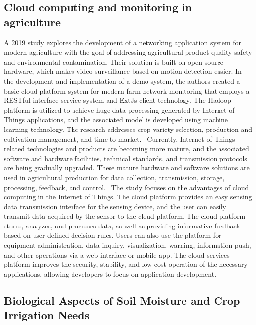 \documentclass[11pt]{scrartcl} %
\begin{document}
\subsection{Cloud computing and monitoring in agriculture}
A 2019 study explores the development of a networking application system for modern agriculture with the goal of addressing agricultural product quality safety and environmental contamination. Their solution is built on open-source hardware, which makes video surveillance based on motion detection easier. In the development and implementation of a demo system, the authors created a basic cloud platform system for modern farm network monitoring that employs a RESTful interface service system and \gls{ExtJs} client technology. The \gls{Hadoop} platform is utilized to achieve huge data processing generated by Internet of Things applications, and the associated model is developed using machine learning technology. The research addresses crop variety selection, production and cultivation management, and time to market.~\parencite{cloud_computing_and_monitoring}
\newline Currently, Internet of Things-related technologies and products are becoming more mature, and the associated software and hardware facilities, technical standards, and transmission protocols are being gradually upgraded. These mature hardware and software solutions are used in agricultural production for data collection, transmission, storage, processing, feedback, and control.~\parencite{cloud_computing_and_monitoring}
\newline The study focuses on the advantages of cloud computing in the Internet of Things. The cloud platform provides an easy sensing data transmission interface for the sensing device, and the user can easily transmit data acquired by the sensor to the cloud platform. The cloud platform stores, analyzes, and processes data, as well as providing informative feedback based on user-defined decision rules. Users can also use the platform for equipment administration, data inquiry, visualization, warning, information push, and other operations via a web interface or mobile app. The cloud services platform improves the security, stability, and low-cost operation of the necessary applications, allowing developers to focus on application development.~\parencite{cloud_computing_and_monitoring}
\subsection{Biological Aspects of Soil Moisture and Crop Irrigation Needs}
\end{document}
